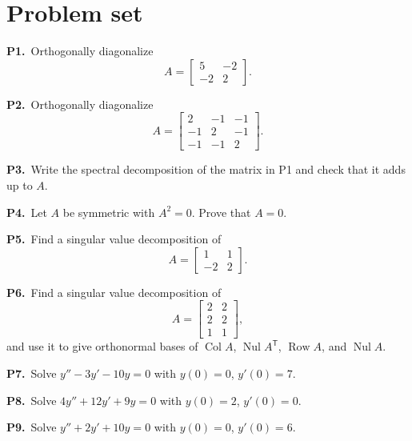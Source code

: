\documentclass[10pt]{scrartcl}
\DeclareMathOperator{\Nul}{Nul}
\DeclareMathOperator{\Col}{Col}
\DeclareMathOperator{\Row}{Row}
\begin{document}
\section{Problem set}
\begin{prob}
  \textbf{P1.}\ Orthogonally diagonalize
  \[
    A=\begin{bmatrix}5&-2\\-2&2\end{bmatrix}.
  \]
\end{prob}
\begin{prob}
  \textbf{P2.}\ Orthogonally diagonalize
  \[
    A=\begin{bmatrix}2&-1&-1\\-1&2&-1\\-1&-1&2\end{bmatrix}.
  \]
\end{prob}
\begin{prob}
  \textbf{P3.}\ Write the spectral decomposition of the matrix in P1 and check that it adds up to $A$.
\end{prob}
\begin{prob}
  \textbf{P4.}\ Let $A$ be symmetric with $A^2=0$. Prove that $A=0$.
\end{prob}
\begin{prob}
  \textbf{P5.}\ Find a singular value decomposition of
  \[
    A=\begin{bmatrix}1&1\\-2&2\end{bmatrix}.
  \]
\end{prob}
\begin{prob}
  \textbf{P6.}\ Find a singular value decomposition of
  \[
    A=\begin{bmatrix}2&2\\2&2\\1&1\end{bmatrix},
  \]
  and use it to give orthonormal bases of $\Col A$, $\Nul A^{\mathsf T}$, $\Row A$, and $\Nul A$.
\end{prob}
\begin{prob}
  \textbf{P7.}\ Solve $y''-3y'-10y=0$ with $y(0)=0$, $y'(0)=7$.
\end{prob}
\begin{prob}
  \textbf{P8.}\ Solve $4y''+12y'+9y=0$ with $y(0)=2$, $y'(0)=0$.
\end{prob}
\begin{prob}
  \textbf{P9.}\ Solve $y''+2y'+10y=0$ with $y(0)=0$, $y'(0)=6$.
\end{prob}
\end{document}
